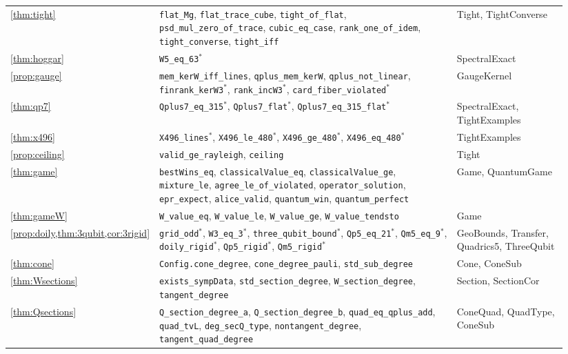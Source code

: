 \documentclass[a4paper,onecolumn,11pt,unpublished,nopdfoutputerror]{quantumarticle}
\theoremstyle{definition}
\newcommand{\lname}[1]{\texttt{\textcolor{leangreen}{#1}}}
\begin{document}
{\begin{longtable}{@{}>{\raggedright\arraybackslash}p{0.2\linewidth}>{\raggedright\arraybackslash}p{0.54\linewidth}>{\raggedright\arraybackslash}p{0.2\linewidth}@{}}
\cref{thm:tight} & \lname{flat\_Mg}, \lname{flat\_trace\_cube}, \lname{tight\_of\_flat}, \lname{psd\_mul\_zero\_of\_trace}, \lname{cubic\_eq\_case}, \lname{rank\_one\_of\_idem}, \lname{tight\_converse}, \lname{tight\_iff} & Tight, TightConverse\\
\cref{thm:hoggar} & \lname{W5\_eq\_63}$^\ast$ & SpectralExact\\
\cref{prop:gauge} & \lname{mem\_kerW\_iff\_lines}, \lname{qplus\_mem\_kerW}, \lname{qplus\_not\_linear}, \lname{finrank\_kerW3}$^\ast$, \lname{rank\_incW3}$^\ast$, \lname{card\_fiber\_violated}$^\ast$ & GaugeKernel\\
\cref{thm:qp7} & \lname{Qplus7\_eq\_315}$^\ast$, \lname{Qplus7\_flat}$^\ast$, \lname{Qplus7\_eq\_315\_flat}$^\ast$ & SpectralExact, TightExamples\\
\cref{thm:x496} & \lname{X496\_lines}$^\ast$, \lname{X496\_le\_480}$^\ast$, \lname{X496\_ge\_480}$^\ast$, \lname{X496\_eq\_480}$^\ast$ & TightExamples\\
\cref{prop:ceiling} & \lname{valid\_ge\_rayleigh}, \lname{ceiling} & Tight\\
\cref{thm:game} & \lname{bestWins\_eq}, \lname{classicalValue\_eq}, \lname{classicalValue\_ge}, \lname{mixture\_le}, \lname{agree\_le\_of\_violated}, \lname{operator\_solution}, \lname{epr\_expect}, \lname{alice\_valid}, \lname{quantum\_win}, \lname{quantum\_perfect} & Game, QuantumGame\\
\cref{thm:gameW} & \lname{W\_value\_eq}, \lname{W\_value\_le}, \lname{W\_value\_ge}, \lname{W\_value\_tendsto} & Game\\
\cref{prop:doily,thm:3qubit,cor:3rigid} & \lname{grid\_odd}$^\ast$, \lname{W3\_eq\_3}$^\ast$, \lname{three\_qubit\_bound}$^\ast$, \lname{Qp5\_eq\_21}$^\ast$, \lname{Qm5\_eq\_9}$^\ast$, \lname{doily\_rigid}$^\ast$, \lname{Qp5\_rigid}$^\ast$, \lname{Qm5\_rigid}$^\ast$ & GeoBounds, Transfer, Quadrics5, ThreeQubit\\
\cref{thm:cone} & \lname{Config.cone\_degree}, \lname{cone\_degree\_pauli}, \lname{std\_sub\_degree} & Cone, ConeSub\\
\cref{thm:Wsections} & \lname{exists\_sympData}, \lname{std\_section\_degree}, \lname{W\_section\_degree}, \lname{tangent\_degree} & Section, SectionCor\\
\cref{thm:Qsections} & \lname{Q\_section\_degree\_a}, \lname{Q\_section\_degree\_b}, \lname{quad\_eq\_qplus\_add}, \lname{quad\_tvL}, \lname{deg\_secQ\_type}, \lname{nontangent\_degree}, \lname{tangent\_quad\_degree} & ConeQuad, QuadType, ConeSub\\

\end{longtable}}
\end{document}
